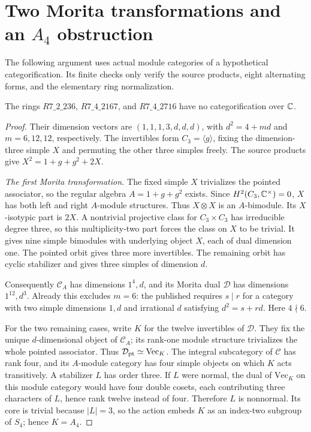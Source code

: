 \section{Two Morita transformations and an \texorpdfstring{$A_4$}{A4} obstruction}
\label{sec:c3-a4}
The following argument uses actual module categories of a hypothetical
categorification. Its finite checks only verify the source products,
eight alternating forms, and the elementary ring normalization.

\begin{theorem}
\label{thm:c3-a4}
The rings $R7\_2\_236$, $R7\_4\_2167$, and $R7\_4\_2716$
have no categorification over $\mathbb C$.
\end{theorem}
\begin{proof}
Their dimension vectors are $(1,1,1,3,d,d,d)$, with
$d^2=4+md$ and $m=6,12,12$, respectively. The invertibles form
$C_3=\langle g\rangle$, fixing the dimension-three simple $X$ and
permuting the other three simples freely. The source products give
$X^2=1+g+g^2+2X$.

\emph{The first Morita transformation.}
The fixed simple $X$ trivializes the pointed associator, so the
regular algebra $A=1+g+g^2$ exists. Since
$H^2(C_3,\mathbb C^\times)=0$, $X$ has both left and right $A$-module
structures. Thus $X\otimes X$ is an $A$-bimodule. Its $X$-isotypic
part is $2X$. A nontrivial projective class for $C_3\times C_3$
has irreducible degree three, so this multiplicity-two part forces
the class on $X$ to be trivial. It gives nine simple bimodules with
underlying object $X$, each of dual dimension one. The pointed
orbit gives three more invertibles. The remaining orbit has cyclic
stabilizer and gives three simples of dimension $d$.

Consequently $\mathcal C_A$ has dimensions $1^4,d$, and its Morita
dual $\mathcal D$ has dimensions $1^{12},d^3$. Already this excludes
$m=6$: the published \cite[Proposition~3.3]{Schopieray} requires
$s\mid r$ for a category with two simple dimensions $1,d$ and
irrational $d$ satisfying $d^2=s+rd$. Here $4\nmid6$.

For the two remaining cases, write $K$ for the twelve invertibles
of $\mathcal D$. They fix the unique $d$-dimensional object of
$\mathcal C_A$; its rank-one module structure trivializes the whole
pointed associator. Thus $\mathcal D_{\rm pt}\simeq\mathrm{Vec}_K$.
The integral subcategory of $\mathcal C$ has rank four, and its
$A$-module category has four simple objects on which $K$ acts
transitively. A stabilizer $L$ has order three. If $L$ were normal,
the dual of $\mathrm{Vec}_K$ on this module category would have
four double cosets, each contributing three characters of $L$,
hence rank twelve instead of four. Therefore $L$ is nonnormal. Its core is trivial because $|L|=3$,
so the action embeds $K$ as an index-two subgroup of $S_4$; hence
$K=A_4$.


\end{proof}
